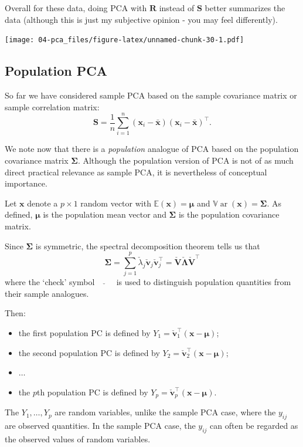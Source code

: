 \documentclass[
]{book}
\providecommand{\tightlist}{%
  \setlength{\itemsep}{0pt}\setlength{\parskip}{0pt}}
\theoremstyle{definition}
\theoremstyle{definition}
\theoremstyle{definition}
\theoremstyle{definition}
\theoremstyle{remark}
\begin{document}
Overall for these data, doing PCA with \(\mathbf R\) instead of \(\mathbf S\) better summarizes the data (although this is just my subjective opinion - you may feel differently).

\texttt{[image: 04-pca\_files/figure-latex/unnamed-chunk-30-1.pdf]}

\subsection{Population PCA}\label{population-pca}

So far we have considered sample PCA based on the sample covariance matrix or sample correlation matrix:
\[
\mathbf S=\frac{1}{n}\sum_{i=1}^n (\mathbf x_i-\bar{\mathbf x})(\mathbf x_i-\bar{\mathbf x})^\top.
\]

We note now that there is a \emph{population} analogue of PCA based on the population
covariance matrix \(\boldsymbol{\Sigma}\). Although the population version of PCA is not of as much direct practical
relevance as sample PCA, it is nevertheless of conceptual importance.

Let \(\mathbf x\) denote a \(p \times 1\) random vector with \({\mathbb{E}}(\mathbf x)={\pmb \mu}\) and \({\mathbb{V}\operatorname{ar}}(\mathbf x)={\pmb \Sigma}\). As defined,
\(\pmb \mu\) is the population mean vector and \(\pmb \Sigma\) is the population covariance matrix.

Since \(\pmb \Sigma\) is symmetric, the spectral decomposition theorem tells us that
\[
{\pmb \Sigma}=\sum_{j=1}^p \check{\lambda}_j \check{\mathbf v}_j \check{\mathbf v}_j^\top=\check{\mathbf V} \check{\boldsymbol \Lambda}\check{\mathbf V}^\top
\]
where the `check' symbol \(\quad \check{} \quad\) is used to distinguish population quantities from their sample analogues.

Then:

\begin{itemize}
\tightlist
\item
  the first population PC is defined by \(Y_1=\check{\mathbf v}_1^\top (\mathbf x-{\pmb \mu})\);
\item
  the second population PC is defined by \(Y_2=\check{\mathbf v}_2^\top (\mathbf x-{\pmb \mu})\);
\item
  \(\ldots\)
\item
  the \(p\)th population PC is defined by \(Y_p=\check{\mathbf v}_p^\top (\mathbf x-{\pmb \mu})\).
\end{itemize}

The \(Y_1, \ldots , Y_p\) are random variables, unlike the sample PCA case, where the \(y_{ij}\) are observed quantities.
In the sample PCA case, the \(y_{ij}\) can often be regarded as the observed values of random variables.
\end{document}
